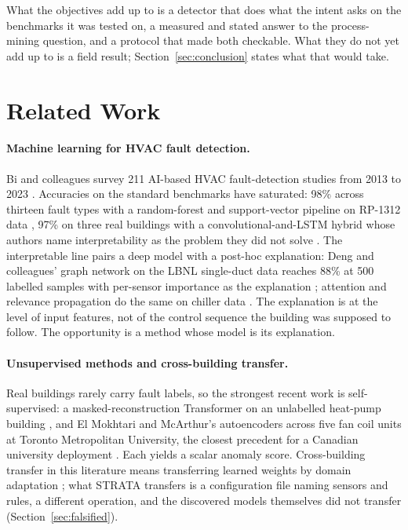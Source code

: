 \documentclass[11pt,letterpaper]{article}
\begin{document}
What the objectives add up to is a detector that does what the intent asks on the benchmarks it was tested on, a measured and stated answer to the process-mining question, and a protocol that made both checkable. What they do not yet add up to is a field result; Section~\ref{sec:conclusion} states what that would take.

\section{Related Work}
\label{sec:related}
\paragraph{Machine learning for HVAC fault detection.} Bi and colleagues survey 211 AI-based HVAC fault-detection studies from 2013 to 2023 \cite{bi2024aihvacreview}. Accuracies on the standard benchmarks have saturated: 98\% across thirteen fault types with a random-forest and support-vector pipeline on RP-1312 data \cite{tun2021hybridrfsvm}, 97\% on three real buildings with a convolutional-and-LSTM hybrid whose authors name interpretability as the problem they did not solve \cite{prince2025improved1dcnnlstm}. The interpretable line pairs a deep model with a post-hoc explanation: Deng and colleagues' graph network on the LBNL single-duct data reaches 88\% at 500 labelled samples with per-sensor importance as the explanation \cite{deng2024afgcn}; attention and relevance propagation do the same on chiller data \cite{wang2025xmhac,li2023cnnlrp}. The explanation is at the level of input features, not of the control sequence the building was supposed to follow. The opportunity is a method whose model is its explanation.

\paragraph{Unsupervised methods and cross-building transfer.} Real buildings rarely carry fault labels, so the strongest recent work is self-supervised: a masked-reconstruction Transformer on an unlabelled heat-pump building \cite{abdollah2024transformerssl}, and El Mokhtari and McArthur's autoencoders across five fan coil units at Toronto Metropolitan University, the closest precedent for a Canadian university deployment \cite{elmokhtari2024aebas}. Each yields a scalar anomaly score. Cross-building transfer in this literature means transferring learned weights by domain adaptation \cite{lei2025crossbuildinguda,ghalamsiah2025canhvac}; what STRATA transfers is a configuration file naming sensors and rules, a different operation, and the discovered models themselves did not transfer (Section~\ref{sec:falsified}).
\end{document}
